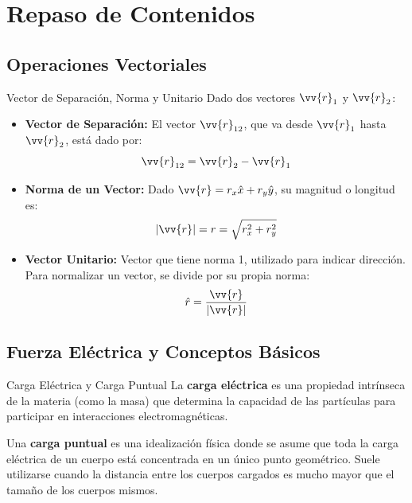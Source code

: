 \documentclass[11pt]{article}
\begin{document}
\crearEncabezado

\section*{Repaso de Contenidos}

\subsection*{Operaciones Vectoriales}

\begin{boxTeoria}{Vector de Separación, Norma y Unitario}
    Dado dos vectores $\vv{r}_1$ y $\vv{r}_2$:
    \begin{itemize}
        \item \textbf{Vector de Separación:} El vector $\vv{r}_{12}$, que va desde $\vv{r}_1$ hasta $\vv{r}_2$, está dado por:
              \begin{equation*}
                  \vv{r}_{12} = \vv{r}_2 - \vv{r}_1
              \end{equation*}
        \item \textbf{Norma de un Vector:} Dado $\vv{r} = r_x\hat{x} + r_y\hat{y}$, su magnitud o longitud es:
              \begin{equation*}
                  |\vv{r}| = r = \sqrt{r_x^2 + r_y^2}
              \end{equation*}
        \item \textbf{Vector Unitario:} Vector que tiene norma 1, utilizado para indicar dirección. Para normalizar un vector, se divide por su propia norma:
              \begin{equation*}
                  \hat{r} = \frac{\vv{r}}{|\vv{r}|}
              \end{equation*}
    \end{itemize}
\end{boxTeoria}

\subsection*{Fuerza Eléctrica y Conceptos Básicos}

\begin{boxTeoria}{Carga Eléctrica y Carga Puntual}
    La \textbf{carga eléctrica} es una propiedad intrínseca de la materia (como la masa) que determina la capacidad de las partículas para participar en interacciones electromagnéticas.

    Una \textbf{carga puntual} es una idealización física donde se asume que toda la carga eléctrica de un cuerpo está concentrada en un único punto geométrico. Suele utilizarse cuando la distancia entre los cuerpos cargados es mucho mayor que el tamaño de los cuerpos mismos.
\end{boxTeoria}
\end{document}
